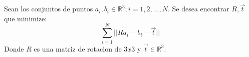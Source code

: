 Sean los conjuntos de puntos  ${a_i},{b_i} \in \mathbb{R}^3;i = 1,2,...,N$.
Se desea encontrar $R,\vec{t}$ que minimize:
$$
\sum\limits_{i=1}^N || Ra_i - b_i - \vec{t} ||
$$
Donde $R$ es una matriz de rotacion de $3x3$ y $\vec{t} \in \mathbb{R}^3$.

